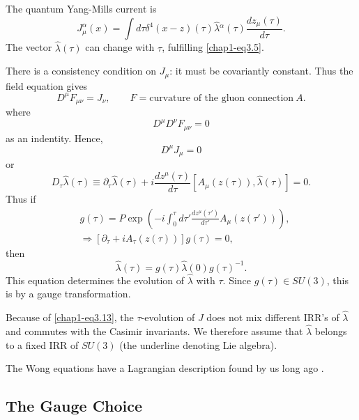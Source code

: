 The quantum Yang-Mills current is
\begin{equation}
J_\mu^\alpha (x) = \int d \tau \delta^4 (x -z) (\tau) \hat{\lambda} {}^\alpha (\tau) \frac{dz_\mu (\tau)}{d \tau}. \label{chap1-eq3.6}
\end{equation}
The vector $\hat{\lambda} (\tau)$ can change with $\tau$, fulfilling \eqref{chap1-eq3.5}.

There is a consistency condition on $J_\mu$: it must be covariantly constant. Thus the field equation gives
\begin{equation}
D^\mu F_{\mu \nu} = J_\nu, \qquad F= \text{curvature of the gluon connection}~ A. \label{chap1-eq3.7}
\end{equation}
where
\begin{equation}
D^\mu D^\nu F_{\mu \nu}=0 \label{chap1-eq3.8}
\end{equation}
as an indentity. Hence,
\begin{equation}
D^\mu J_\mu =0 \label{chap1-eq3.9}
\end{equation}
or
\begin{equation}
D_\tau \hat{\lambda} (\tau) \equiv \partial_\tau \hat{\lambda} (\tau) + i \frac{dz^\mu(\tau)}{d \tau} \left[A_\mu (z(\tau)), \hat{\lambda}(\tau)\right] =0. \label{chap1-eq3.10}
\end{equation}
Thus if
\begin{align}
  & g(\tau) = P \exp \left(-i \int^\tau_0 d \tau' \frac{dz^\mu(\tau')}{d \tau'} A_\mu (z(\tau')) \right), \label{chap1-eq3.11}\\
  & \Longrightarrow [\partial_\tau +i A_\tau (z(\tau))] g (\tau)=0, \label{chap1-eq3.12}
\end{align}
then
\begin{equation}
\hat{\lambda} (\tau) = g (\tau) \hat{\lambda} (0) g (\tau)^{-1}. \label{chap1-eq3.13}
\end{equation}
This equation determines the evolution of $\hat{\lambda}$ with $\tau$. Since $g(\tau) \in SU(3)$, this is by a gauge transformation.

Because of \eqref{chap1-eq3.13}, the $\tau$-evolution of $J$ does not mix different IRR's of $\hat{\lambda}$ and commutes with the Casimir invariants. We therefore assume that $\hat{\lambda}$ belongs to a fixed IRR of \underline{$SU(3)$} (the underline denoting Lie algebra).

The Wong equations have a Lagrangian description found by us long ago \cite{key12}.

\subsection{The Gauge Choice}\label{chap1-sec3.1}

